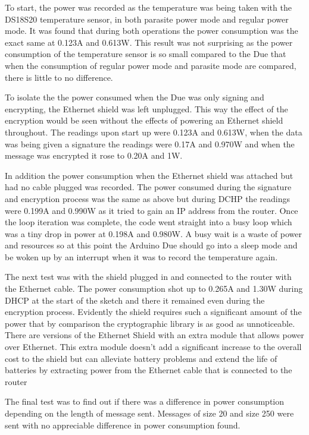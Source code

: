 To start, the power was recorded as the temperature was being taken with the DS18S20 temperature sensor, in both parasite power mode and regular power mode. It was found that during both operations the power consumption was the exact same at 0.123A and 0.613W. This result was not surprising as the power consumption of the temperature sensor is so small compared to the Due that when the consumption of regular power mode and parasite mode are compared, there is little to no difference.

To isolate the the power consumed when the Due was only signing and encrypting, the Ethernet shield was left unplugged. This way the effect of the encryption would be seen without the effects of powering an Ethernet shield throughout. 
The readings upon start up were 0.123A and 0.613W, when the data was being given a signature the readings were 0.17A and 0.970W and when the message was encrypted it rose to 0.20A and 1W. 

In addition the power consumption when the Ethernet shield was attached but had no cable plugged was recorded. The power consumed during the signature and encryption process was the same as above but during DCHP the readings were 0.199A and 0.990W as it tried to gain an IP address from the router. Once the loop iteration was complete, the code went straight into a busy loop which was a tiny drop in power at 0.198A and 0.980W. A busy wait is a waste of power and resources so at this point the Arduino Due should go into a sleep mode and be woken up by an interrupt when it was to record the temperature again. 

The next test was with the shield plugged in and connected to the router with the Ethernet cable. The power consumption shot up to 0.265A and 1.30W during DHCP at the start of the sketch and there it remained even during the encryption process. Evidently the shield requires such a significant amount of the power that by comparison the cryptographic library is as good as unnoticeable. There are versions of the Ethernet Shield with an extra module that allows power over Ethernet. This extra module doesn't add a significant increase to the overall cost to the shield but can alleviate battery problems and extend the life of batteries by extracting power from the Ethernet cable that is connected to the router

The final test was to find out if there was a difference in power consumption depending on the length of message sent. Messages of size 20 and size 250 were sent with no appreciable difference in power consumption found.


